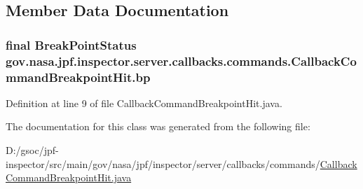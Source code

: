 \subsection{Member Data Documentation}
\subsubsection[{\texorpdfstring{bp}{bp}}]{\setlength{\rightskip}{0pt plus 5cm}final {\bf Break\+Point\+Status} gov.\+nasa.\+jpf.\+inspector.\+server.\+callbacks.\+commands.\+Callback\+Command\+Breakpoint\+Hit.\+bp\hspace{0.3cm}{\ttfamily [private]}}\hypertarget{classgov_1_1nasa_1_1jpf_1_1inspector_1_1server_1_1callbacks_1_1commands_1_1_callback_command_breakpoint_hit_a6b772099d622f8f14ee067c7d7ce46ce}{}\label{classgov_1_1nasa_1_1jpf_1_1inspector_1_1server_1_1callbacks_1_1commands_1_1_callback_command_breakpoint_hit_a6b772099d622f8f14ee067c7d7ce46ce}


Definition at line 9 of file Callback\+Command\+Breakpoint\+Hit.\+java.



The documentation for this class was generated from the following file\+:\begin{DoxyCompactItemize}
\item 
D\+:/gsoc/jpf-\/inspector/src/main/gov/nasa/jpf/inspector/server/callbacks/commands/\hyperlink{_callback_command_breakpoint_hit_8java}{Callback\+Command\+Breakpoint\+Hit.\+java}\end{DoxyCompactItemize}
